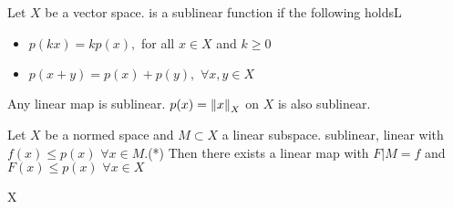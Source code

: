 \begin{definition}\rm\nextline
	Let $X$ be a vector space.  is a sublinear function if the following holdsL
	\begin{itemize}
		\item $p(kx)=kp(x),$ for all $x\in X$ and $k\geq0$
		\item $p(x+y)=p(x)+p(y),\,\,\forall x,y\in X$
	\end{itemize}
\end{definition}

\begin{example}\rm\nextline
    Any linear map is sublinear. $p(x)=\left\|{x}\right\|_X$ on $X$ is also sublinear.
\end{example}

\begin{theorem}\rm\nextline
    Let $X$ be a normed space and $M\subset X$ a linear subspace.  sublinear,  linear with 
    $f(x)\leq p(x)\,\,\forall x\in M$.(*)
    Then there exists a linear map  with $F|M=f$ and $F(x)\leq p(x)\,\,\forall x\in X$
\end{theorem}

\begin{remark}[induction]\nextline\rm
    \placeholder
    X
\end{remark}

